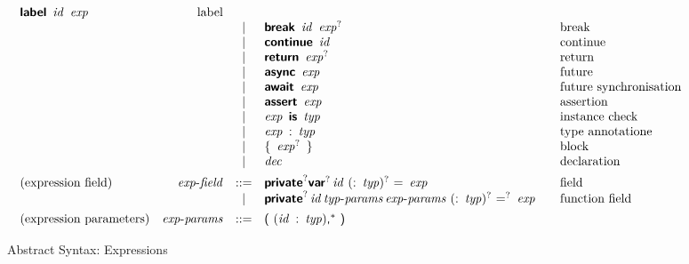 \begin{figure*}
$$\begin{array}{@{}lrcl@{\qquad}l}
  \KK{label}~\x{id}~\x{exp}
    & \text{label} \\&&|&
  \KK{break}~\x{id}~\x{exp}^?
    & \text{break} \\&&|&
  \KK{continue}~\x{id}
    & \text{continue} \\&&|&
  \KK{return}~\x{exp}^?
    & \text{return} \\&&|&
  \KK{async}~\x{exp}
    & \text{future} \\&&|&
  \KK{await}~\x{exp}
    & \text{future synchronisation} \\&&|&
  \KK{assert}~\x{exp}
    & \text{assertion} \\&&|&
  \x{exp}~\KK{is}~\x{typ}
    & \text{instance check} \\&&|&
  \x{exp}~\K:~\x{typ}
    & \text{type annotatione} \\&&|&
  \K\{~\x{exp}^?~\K\}
    & \text{block} \\&&|&
  \x{dec}
    & \text{declaration} \\
[1ex]
\text{(expression field)} & \x{exp-field} &::=&
  \KK{private}^? \KK{var}^? \x{id}~(\K:~\x{typ})^?~\K=~\x{exp}
    & \text{field} \\&&|&
  \KK{private}^? \x{id} \x{typ-params} \x{exp-params}~(\K:~\x{typ})^?~\K=^?~\x{exp}
    & \text{function field} \\
[1ex]
\text{(expression parameters)} & \x{exp-params} &::=&
  \K(~(\x{id}~\K:~\x{typ})\K,^\ast~\K) \\
\end{array}
$$

\caption{Abstract Syntax: Expressions}
\label{fig:syntax.exp}

\end{figure*}


